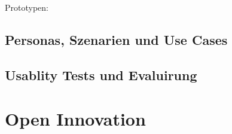 Prototypen:


\subsection{Personas, Szenarien und Use Cases}




\subsection{Usablity Tests und Evaluirung}


\section{Open Innovation}




